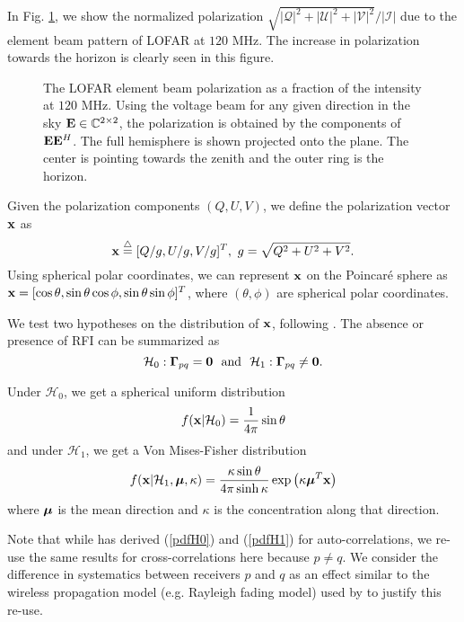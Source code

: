 \documentclass[conference]{IEEEtran}
\newcommand{\beq}{\begin{equation}}
\newcommand{\eeq}{\end{equation}}
\def\bmath#1{\mbox{\boldmath$#1$}}
\begin{document}
In Fig. \ref{beam}, we show the normalized polarization $\sqrt{|\mathcal{Q}|^2+|\mathcal{U}|^2+|\mathcal{V}|^2}/|\mathcal{I}|$ due to the element beam pattern of LOFAR at $120$ MHz. The increase in polarization towards the horizon is clearly seen in this figure.

\begin{figure}[htbp]
\begin{minipage}[b]{0.98\linewidth}
\centering
\centerline{}
\end{minipage}
\caption{The LOFAR element beam polarization as a fraction of the intensity at $120$ MHz. Using the voltage beam for any given direction in the sky ${\bf E} \in\mathbb{C}^{2\times 2}$, the polarization is obtained by the components of ${\bf E}{\bf E}^H$. The full hemisphere is shown projected onto the plane. The center is pointing towards the zenith and the outer ring is the horizon.}
\label{beam}
\end{figure}

Given the polarization components $(Q,U,V)$, we define the polarization vector ${\bf x}$ as
\beq \label{polvec}
{\bf x}\buildrel\triangle\over=[Q/g, U/g, V/g]^T,\ g=\sqrt{Q^2+U^2+V^2}.
\eeq
Using spherical polar coordinates, we can represent ${\bf x}$ on the Poincar\'e sphere as ${\bf x}=[\cos\theta, \sin\theta \cos\phi, \sin\theta \sin\phi]^T$, where $(\theta,\phi)$ are spherical polar coordinates.

We test two hypotheses on the distribution of ${\bf x}$, following \cite{Guo2013}. The absence or presence of RFI can be summarized as 
\beq
\mathcal{H}_0: {\bmath \Gamma}_{pq}={\bf 0}\ \ \mathrm{and}\ \  \mathcal{H}_1: {\bmath \Gamma}_{pq}\ne{\bf 0}.
\eeq

Under $\mathcal{H}_0$, we get a spherical uniform distribution
\beq \label{pdfH0}
f({\bf x} {\mid} \mathcal{H}_0)=\frac{1}{4\pi} \sin\theta
\eeq
and under $\mathcal{H}_1$, we get a Von Mises-Fisher distribution
\beq \label{pdfH1}
f({\bf x} {\mid} \mathcal{H}_1, {\bmath \mu},\kappa) =\frac{\kappa \sin\theta}{4\pi \sinh \kappa} \exp\left(\kappa {\bmath \mu}^T {\bf x}\right) 
\eeq
where ${\bmath \mu}$ is the mean direction and $\kappa$ is the concentration along that direction.

Note that while \cite{Guo2013} has derived (\ref{pdfH0}) and (\ref{pdfH1}) for auto-correlations, we re-use the same results for cross-correlations here because $p\ne q$. We consider the difference in systematics between receivers $p$ and $q$ as an effect similar to the wireless propagation model (e.g. Rayleigh fading model) used by \cite{Guo2013} to justify this re-use.
\end{document}
